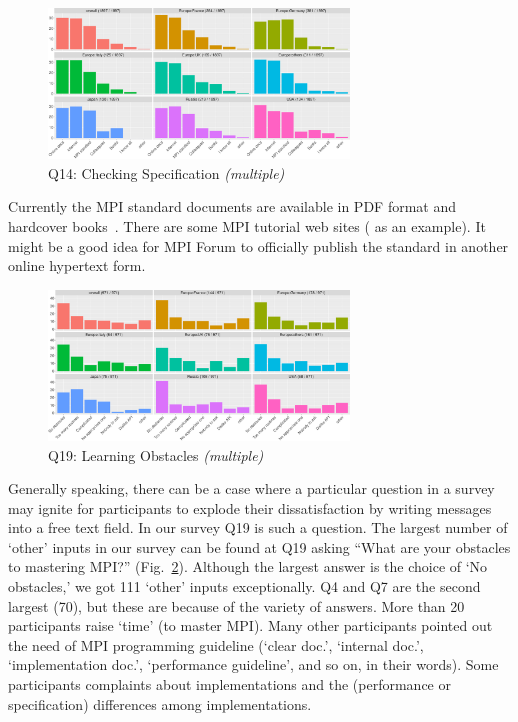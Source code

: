 \documentclass[conference,10pt,letterpaper]{IEEEtran}
\def\myquote#1{`#1'}
\begin{document}
\begin{figure}[htb]
\begin{center}
\includegraphics[width=8cm]{R-scripts/Q14.pdf}
\caption{Q14: Checking Specification {\it(multiple)}}
\label{fig:checking-spec}
\end{center}
\end{figure}

Currently the MPI standard documents are available in PDF format and
hardcover books~\cite{mpi-hardcover}. There are some MPI tutorial web
sites (\cite{mpi-tutorial} as an example). It might be a good idea for
MPI Forum to officially publish the standard in another
online hypertext form.

\begin{figure}[htb]
\begin{center}
\includegraphics[width=8cm]{R-scripts/Q19.pdf}
\caption{Q19: Learning Obstacles {\it(multiple)}}
\label{fig:learning-obstacles}
\end{center}
\end{figure}

Generally speaking, there can be a case where a particular question in
a survey may ignite for participants to explode their dissatisfaction
by writing messages into a free text field. In our survey Q19 is
such a question. The 
largest number of \myquote{other} inputs in our survey can be found 
at Q19 asking ``What are your obstacles to mastering MPI?''
(Fig.~\ref{fig:learning-obstacles}). Although the largest answer is
the choice of \myquote{No obstacles,} we got 111 \myquote{other} inputs
exceptionally. Q4 and Q7 are the second largest (70), but these are
because of the variety of answers. 
More than 20 participants raise \myquote{time} (to master MPI). Many
other participants pointed 
out the need of MPI programming guideline (\myquote{clear doc.},
\myquote{internal doc.}, \myquote{implementation 
  doc.}, \myquote{performance guideline}, and so on, in their words).
Some participants complaints about implementations and the
(performance or specification) differences among implementations.  
\end{document}
